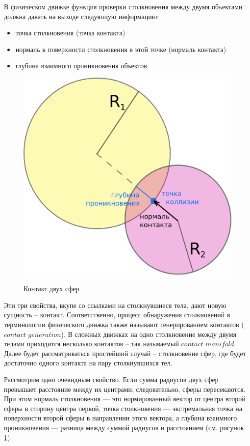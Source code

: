 В физическом движке функция проверки столкновения между двумя объектами должна давать на выходе следующую
информацию:
\begin{itemize}
  \item точка столкновения (точка контакта)
  \item нормаль к поверхности столкновения в этой точке (нормаль контакта)
  \item глубина взаимного проникновения объектов
\end{itemize}
\begin{figure}[ht!]
\begin{center}
\includegraphics[scale=0.45]{./Geometry/SphereCollision.eps}  \\
\caption{Контакт двух сфер}\label{SphereCollision}
\end{center}
\end{figure}
Эти три свойства, вкупе со ссылками на столкнувшиеся тела, дают новую сущность – контакт. Соответственно,
процесс обнаружения столкновений в терминологии физического движка также называют генерированием
контактов ($contact$ $generation$). В сложных движках на одно столкновение между двумя телами приходится несколько
контактов – так называемый $contact$ $manifold$. Далее будет рассматриваться простейший случай – столкновение сфер, где будет
достаточно одного контакта на пару столкнувшихся тел.

Рассмотрим одно очевидным свойство. Если сумма радиусов двух сфер превышает расстояние между их центрами, следовательно, сферы пересекаются.
При этом нормаль столкновения --- это нормированный вектор от центра второй сферы в сторону центра первой,
точка столкновения --- экстремальная точка на поверхности второй сферы в направлении этого вектора, а глубина взаимного
проникновения --- разница между суммой радиусов и расстоянием (см. рисунок \ref{SphereCollision}). %

